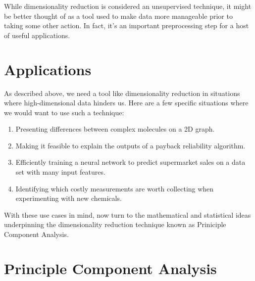 While dimensionality reduction is considered an unsupervised technique, it might be better thought of as a tool used to make data more manageable prior to taking some other action. In fact, it's an important preprocessing step for a host of useful applications.

\section{Applications}
As described above, we need a tool like dimensionality reduction in situations where high-dimensional data hinders us. Here are a few specific situations where we would want to use such a technique:

\begin{enumerate}
    \item Presenting differences between complex molecules on a 2D graph.
    \item Making it feasible to explain the outputs of a payback reliability algorithm.
    \item Efficiently training a neural network to predict supermarket sales on a data set with many input features.
    \item Identifying which costly measurements are worth collecting when experimenting with new chemicals.
\end{enumerate}

With these use cases in mind, now turn to the mathematical and statistical ideas underpinning the dimensionality reduction technique known as Priniciple Component Analysis.

\section{Principle Component Analysis}